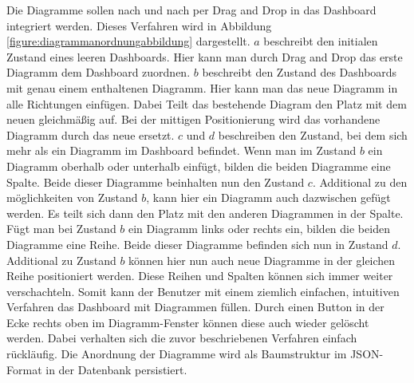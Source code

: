 Die Diagramme sollen nach und nach per Drag and Drop in das Dashboard integriert werden. Dieses Verfahren
wird in Abbildung \ref{figure:diagrammanordnungabbildung} dargestellt. \(a\) beschreibt den
initialen Zustand eines leeren Dashboards. Hier kann man durch Drag and Drop das erste Diagramm dem Dashboard
zuordnen. \(b\) beschreibt den Zustand des Dashboards mit genau einem enthaltenen Diagramm. Hier kann man das
neue Diagramm in alle Richtungen einfügen. Dabei Teilt das bestehende Diagram den Platz mit dem neuen gleichmäßig
auf. Bei der mittigen Positionierung wird das vorhandene Diagramm durch das neue ersetzt. \(c\) und \(d\)
beschreiben den Zustand, bei dem sich mehr als ein Diagramm im Dashboard befindet. Wenn man im Zustand \(b\)
ein Diagramm oberhalb oder unterhalb einfügt, bilden die beiden Diagramme eine Spalte. Beide dieser Diagramme
beinhalten nun den Zustand \(c\). Additional zu den möglichkeiten von Zustand \(b\), kann hier ein Diagramm
auch dazwischen gefügt werden. Es teilt sich dann den Platz mit den anderen Diagrammen in der Spalte.
Fügt man bei Zustand \(b\) ein Diagramm links oder rechts ein, bilden die beiden Diagramme eine Reihe.
Beide dieser Diagramme befinden sich nun in Zustand \(d\). Additional zu Zustand \(b\) können hier nun
auch neue Diagramme in der gleichen Reihe positioniert werden. Diese Reihen und Spalten können sich
immer weiter verschachteln. Somit kann der Benutzer mit einem ziemlich einfachen, intuitiven Verfahren
das Dashboard mit Diagrammen füllen. Durch einen Button in der Ecke rechts oben im Diagramm-Fenster
können diese auch wieder gelöscht werden. Dabei verhalten sich die zuvor beschriebenen Verfahren einfach rückläufig.
Die Anordnung der Diagramme wird als Baumstruktur im JSON-Format in der Datenbank persistiert.
